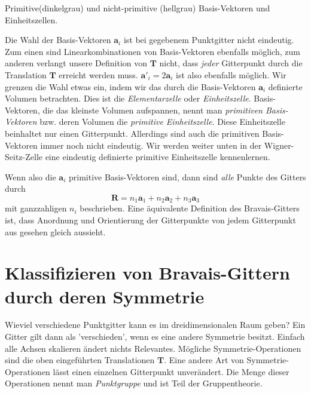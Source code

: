 \begin{marginfigure}

\caption{Primitive(dinkelgrau) und nicht-primitive (hellgrau) Basis-Vektoren und Einheitszellen.}
\end{marginfigure}


Die Wahl der Basis-Vektoren   $\mathbf{a}_i$ ist  bei gegebenem Punktgitter nicht eindeutig. Zum einen sind Linearkombinationen von  Basis-Vektoren ebenfalls möglich, zum anderen verlangt unsere Definition von $\mathbf{T}$ nicht, dass \emph{jeder} Gitterpunkt durch die Translation $\mathbf{T}$  erreicht werden muss.  $\mathbf{a}'_i = 2 \mathbf{a}_i$ ist also ebenfalls möglich. Wir grenzen die Wahl etwas ein, indem wir das durch die Basis-Vektoren   $\mathbf{a}_i$  definierte Volumen betrachten. Dies ist die \emph{Elementarzelle} oder \emph{Einheitszelle}. Basis-Vektoren, die das kleinste Volumen aufspannen, nennt man \emph{primitiven Basis-Vektoren} bzw. deren Volumen die \emph{primitive Einheitszelle}. Diese Einheitszelle beinhaltet nur einen Gitterpunkt. Allerdings sind auch die primitiven Basis-Vektoren immer noch nicht eindeutig. Wir werden weiter unten in der Wigner-Seitz-Zelle eine eindeutig definierte primitive Einheitszelle kennenlernen.

Wenn also die $\mathbf{a}_i$ primitive  Basis-Vektoren sind, dann sind \emph{alle} Punkte des Gitters durch 
\begin{equation}
 \mathbf{R} = n_1 \mathbf{a}_1 + n_2 \mathbf{a}_2 + n_3 \mathbf{a}_3  
\end{equation}
mit ganzzahligen  $n_i$ beschrieben. Eine äquivalente Definition des Bravais-Gitters ist, dass Anordnung und Orientierung der Gitterpunkte von jedem Gitterpunkt aus gesehen gleich aussieht.


\section{Klassifizieren von Bravais-Gittern durch deren Symmetrie}

Wieviel verschiedene Punktgitter kann es im dreidimensionalen Raum geben? Ein Gitter gilt dann als 'verschieden', wenn es eine andere Symmetrie besitzt. Einfach alle Achsen skalieren ändert nichts Relevantes. Mögliche Symmetrie-Operationen sind die oben eingeführten Translationen $\mathbf{T}$. Eine andere Art von Symmetrie-Operationen lässt einen einzelnen Gitterpunkt unverändert. Die Menge dieser Operationen nennt man \emph{Punktgruppe} und ist Teil der Gruppentheorie.

